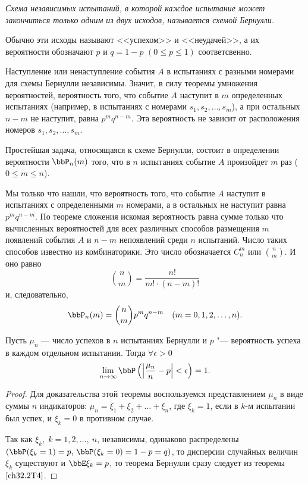 \textit{Схема независимых испытаний, в которой каждое испытание может закончиться только одним из двух исходов, называется схемой Бернулли.}

Обычно эти исходы называют <<успехом>> и <<неудачей>>, а их вероятности обозначают $p$ и $q = 1 - p$ $(0 \le p \le 1)$ соответсвенно.

Наступление или ненаступление события $A$ в испытаниях с разными номерами для схемы Бернулли независимы. Значит, в силу теоремы умножения вероятностей, вероятность того, что событие $A$ наступит в $m$ определенных испытаниях (например, в испытаниях с номерами $s_1, s_2, \ldots, s_m$), а при остальных $n - m$ не наступит, равна $p^mq^{n - m}$. Эта вероятность не зависит от  расположения номеров $s_1, s_2, \ldots, s_m$.

Простейшая задача, относящаяся к схеме Бернулли, состоит в определении вероятности $\bbP_n(m)$ того, что в $n$ испытаниях событие $A$ произойдет $m$ раз ($0 \le m \le n$).

Мы только что нашли, что вероятность того, что событие $A$ наступит в испытаниях с определенными $m$ номерами, а в остальных не наступит равна $p^mq^{n - m}$. По теореме сложения искомая вероятность равна сумме только что вычисленных вероятностей для всех различных способов размещения $m$ появлений события $A$ и $n - m$ непоявлений среди $n$ испытаний. Число таких способов известно из комбинаторики. Это число обозначается  $C_n^m$ или $\binom n m $. И оно равно	
$$
\binom n m = \frac{n!}{m!\cdot(n - m)!}
$$
и, следовательно,
\begin{equation} \label{ch32.1.1eq1}
\bbP_n(m) = \binom n m p^mq^{n - m} \quad (m = 0,1,2,\ldots,n).
\end{equation}

\begin{thm} 
Пусть $\mu_n$ --- число успехов в $n$ испытаниях Бернулли и $p$ "--- вероятность успеха в каждом отдельном испытании. Тогда $\forall \epsilon > 0$
\begin{equation} \label{ch32.2eq7}
\lim_{n \to \infty} \bbP \left( \left| \frac{\mu_n}{n} - p \right| < \epsilon \right) = 1.
\end{equation}
\end{thm}

\begin{proof}
Для доказательства этой теоремы воспользуемся представлением $\mu_n$ в виде суммы $n$ индикаторов: $\mu_n = \xi_1 + \xi_2 + \ldots + \xi_n$, где $\xi_k = 1$, если в $k$-м испытании был успех, и $\xi_k  = 0$ в противном случае.

Так как $\xi_k,\; k = 1,2,\ldots, \: n$, независимы, одинаково распределены $(\bbP( \xi_k = 1) = p, \,\bbP( \xi_k = 0) = 1 - p = q)$, то дисперсии случайных величин $\xi_k$ существуют и $\bbE  \xi_k = p$, то теорема Бернулли сразу следует из теоремы $\ref{ch32.2T4}$.
\end{proof}

